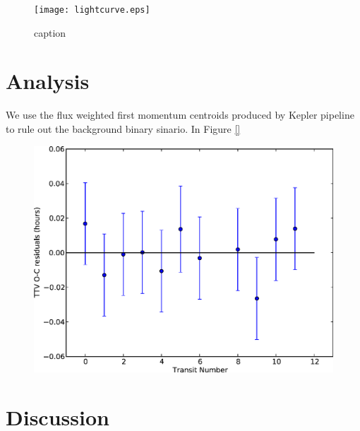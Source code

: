 \documentclass[preprint]{emulateapj}
\begin{document}
\begin{figure}[h!]
  \centering
  \texttt{[image: lightcurve.eps]}
  \caption{caption}
  \label{fig:lightcurve}
\end{figure}

\section{Analysis}
\label{sec:analysis}

We use the flux weighted first momentum centroids produced by Kepler 
pipeline to rule out the background binary sinario. In Figure \ref{}  


\begin{figure}
\includegraphics[width=0.9\linewidth]{TTV.eps}
\end{figure}

\begin{figure}
\end{figure}
\section{Discussion}
\label{sec:discussion}



\end{document}
